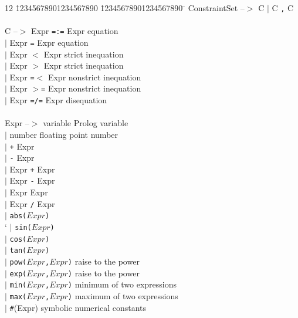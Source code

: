 {\it
\begin{tabbing}
12 \= 12345678901234567890 \= 12345678901234567890 \=	\kill
\> ConstraintSet --$>$   \>  C $|$ C {\tt ,} C   \\
\\
\> C --$>$ \> Expr {\tt =:=} Expr \> {\rm equation} \\
\>    \> $|$ Expr {\tt =} Expr \> {\rm equation} \\
\>    \> $|$ Expr {\tt $<$} Expr \> {\rm strict inequation} \\
\>    \> $|$ Expr {\tt $>$} Expr \> {\rm strict inequation} \\
\>    \> $|$ Expr {\tt =$<$} Expr \> {\rm nonstrict inequation} \\
\>    \> $|$ Expr {\tt $>$=} Expr \> {\rm nonstrict inequation} \\
\>    \> $|$ Expr {\tt =/=} Expr \> {\rm disequation} \\
\\
\> Expr --$>$  \> variable \> {\rm Prolog variable} \\
\> \> $|$ number \> {\rm floating point number} \\
\> \> $|$ {\tt +} Expr \\
\> \> $|$ {\tt -} Expr \\
\> \> $|$ Expr {\tt +}  Expr \\
\> \> $|$ Expr {\tt -} Expr \\
\> \> $|$ Expr {\tt *} Expr \\
\> \> $|$ Expr {\tt /} Expr \\
\> \> $|$ {\tt abs($Expr$)} \\
`\> \> $|$ {\tt sin($Expr$)} \\
\> \> $|$ {\tt cos($Expr$)} \\
\> \> $|$ {\tt tan($Expr$)} \\
\> \> $|$ {\tt pow($Expr$,$Expr$)} \> {\rm raise to the power} \\
\> \> $|$ {\tt exp($Expr$,$Expr$)} \> {\rm raise to the power} \\
\> \> $|$ {\tt min($Expr$,$Expr$)} \> {\rm minimum of two expressions} \\
\> \> $|$ {\tt max($Expr$,$Expr$)} \> {\rm maximum of two expressions} \\
\> \> $|$ \verb|#|(Expr) \> {\rm symbolic numerical constants} 
\end{tabbing}
}

